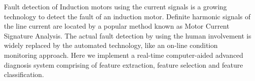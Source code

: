 Fault detection of Induction motors using the current signals is a growing technology to detect the fault of an induction motor. Definite harmonic signals of the line current are located by a popular method known as Motor Current Signature Analysis. The actual fault detection by using the human involvement is widely replaced by the automated technology, like an on-line condition monitoring approach. Here we implement a real-time computer-aided advanced diagnosis system comprising of feature extraction, feature selection and feature classification.
